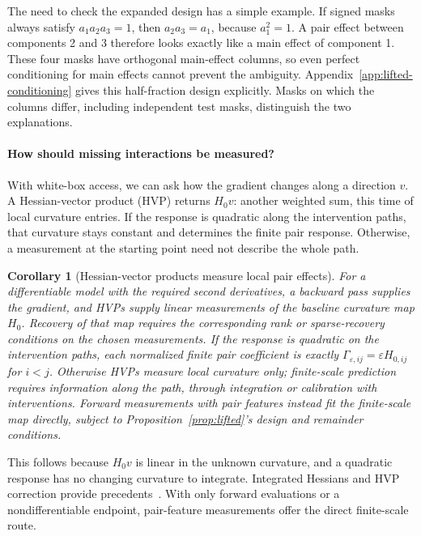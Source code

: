\documentclass[sigconf,10pt,nonacm,balance=false]{acmart}
\newcommand{\eps}{\varepsilon}
\newtheorem{corollary}{Corollary}
\begin{document}
The need to check the expanded design has a simple example. If signed masks always satisfy $a_1a_2a_3=1$, then $a_2a_3=a_1$, because $a_1^2=1$. A pair effect between components 2 and 3 therefore looks exactly like a main effect of component 1. These four masks have orthogonal main-effect columns, so even perfect conditioning for main effects cannot prevent the ambiguity. Appendix~\ref{app:lifted-conditioning} gives this half-fraction design explicitly. Masks on which the columns differ, including independent test masks, distinguish the two explanations.

\paragraph{How should missing interactions be measured?}
With white-box access, we can ask how the gradient changes along a direction $v$. A Hessian-vector product (HVP) returns $H_0v$: another weighted sum, this time of local curvature entries. If the response is quadratic along the intervention paths, that curvature stays constant and determines the finite pair response. Otherwise, a measurement at the starting point need not describe the whole path.

\begin{corollary}[Hessian-vector products measure local pair effects]\label{cor:hvp}
For a differentiable model with the required second derivatives, a backward pass supplies the gradient, and HVPs supply linear measurements of the baseline curvature map $H_0$. Recovery of that map requires the corresponding rank or sparse-recovery conditions on the chosen measurements. If the response is quadratic on the intervention paths, each normalized finite pair coefficient is exactly $\Gamma_{\eps,ij}=\eps H_{0,ij}$ for $i<j$. Otherwise HVPs measure local curvature only; finite-scale prediction requires information along the path, through integration or calibration with interventions. Forward measurements with pair features instead fit the finite-scale map directly, subject to Proposition~\ref{prop:lifted}'s design and remainder conditions.
\end{corollary}

This follows because $H_0v$ is linear in the unknown curvature, and a quadratic response has no changing curvature to integrate. Integrated Hessians and HVP correction provide precedents~\cite{janizek2020integrated,zhang2026lies}. With only forward evaluations or a nondifferentiable endpoint, pair-feature measurements offer the direct finite-scale route.
\end{document}
